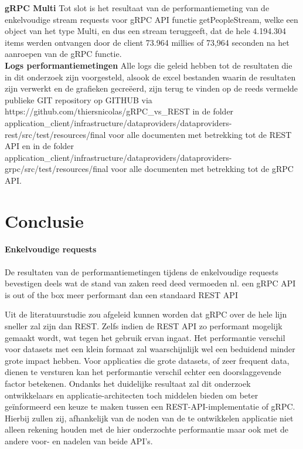 \textbf{gRPC Multi}\newline
Tot slot is het resultaat van de performantiemeting van de enkelvoudige stream requests voor gRPC API functie getPeopleStream,
welke een object van het type Multi, en dus een stream teruggeeft, dat de hele 4.194.304 items werden ontvangen door de client 73.964 millies of 73,964 seconden
na het aanroepen van de gRPC functie.\\

\textbf{Logs performantiemetingen}\newline
Alle logs die geleid hebben tot de resultaten die in dit onderzoek zijn voorgesteld, alsook de excel bestanden waarin de resultaten zijn verwerkt en de grafieken gecre\"eerd,
zijn terug te vinden op de reeds vermelde publieke GIT repository op GITHUB via https://github.com/thiersnicolas/gRPC\_vs\_REST in de folder
application\_client/infrastructure/dataproviders/dataproviders-rest/src/test/resources/final voor alle documenten met betrekking tot de REST API en in de folder
application\_client/infrastructure/dataproviders/dataproviders-grpc/src/test/resources/final voor alle documenten met betrekking tot de gRPC API.\\

\section{Conclusie}

\paragraph{Enkelvoudige requests}
De resultaten van de performantiemetingen tijdens de enkelvoudige requests bevestigen deels wat de stand van zaken reed deed vermoeden nl. een gRPC API is out of the box
meer performant dan een standaard REST API


Uit de literatuurstudie zou afgeleid kunnen worden dat gRPC over de hele lijn sneller zal zijn dan REST. Zelfs indien de REST API zo performant mogelijk
gemaakt wordt, wat tegen het gebruik ervan ingaat. Het performantie verschil voor datasets met een klein formaat zal waarschijnlijk wel een
beduidend minder grote impact hebben. Voor applicaties die grote datasets, of zeer frequent data, dienen te versturen kan het performantie verschil echter
een doorslaggevende factor betekenen. Ondanks het duidelijke resultaat zal dit onderzoek ontwikkelaars en applicatie-architecten toch middelen bieden om
beter geïnformeerd een keuze te maken tussen een REST-API-implementatie of gRPC. Hierbij zullen zij, afhankelijk van de noden van de te ontwikkelen applicatie
niet alleen rekening houden met de hier onderzochte performantie maar ook met de andere voor- en nadelen van beide API's.
